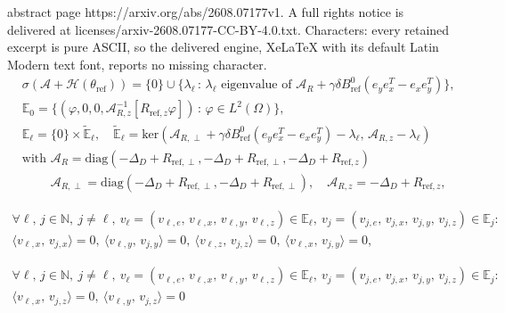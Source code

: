 \documentclass[10pt,a4paper]{amsart}
\newcommand\HH{\mathcal{H}}
\newcommand\calA{\mathcal{A}}
\begin{document}
abstract page https://arxiv.org/abs/2608.07177v1. A full rights notice is delivered at licenses/arxiv-2608.07177-CC-BY-4.0.txt. Characters: every retained excerpt is pure ASCII, so the delivered engine, XeLaTeX with its default Latin Modern text font, reports no missing character.
\begin{equation}\label{eigensystemBT}
\begin{aligned}
&\sigma(\calA+\HH(\theta_{\text{ref}}))=\{0\}\cup\{\lambda_\ell \, :\, \lambda_{\ell}\text{ eigenvalue of }\calA_R
+\gamma\delta B^0_{\text{ref}} (e_ye_x^T-e_xe_y^T)\}, \\ 
&\mathbb{E}_0 = \{(\varphi,0,0, \calA_{R,z}^{-1}[R_{\text{ref},z}\varphi])\, :\,\varphi\in L^2(\Omega)\},
\\ 
&\mathbb{E}_\ell = \{0\}\times\tilde{\mathbb{E}}_{\ell}, \quad
\tilde{\mathbb{E}}_{\ell}
=\text{ker}(\calA_{R,\perp}+\gamma\delta B^0_{\text{ref}} (e_ye_x^T-e_xe_y^T)-\lambda_\ell,\,\calA_{R,z}-\lambda_\ell)\\
&\text{with }\calA_R
=\text{diag}(-\Delta_D+R_{\text{ref},\perp},-\Delta_D+R_{\text{ref},\perp},-\Delta_D+R_{\text{ref},z})\\
&\phantom{\text{with }}
\calA_{R,\perp}=\text{diag}(-\Delta_D+R_{\text{ref},\perp},-\Delta_D+R_{\text{ref},\perp}),\quad
\calA_{R,z}=-\Delta_D+R_{\text{ref},z}, 
\end{aligned}
\end{equation}

\begin{equation}\label{orthogonality}
\begin{aligned}
\forall \ell,\, j\in\mathbb{N}, \ j\not=\ell, \ v_\ell=(v_{\ell,e},\,v_{\ell,x},\,v_{\ell,y},\,v_{\ell,z}) \in \mathbb{E}_\ell, \  
v_j=(v_{j,e},\,v_{j,x},\,v_{j,y},\,v_{j,z}) \in \mathbb{E}_j:\\
\langle v_{\ell,x},\,v_{j,x} \rangle=0, \  
\langle v_{\ell,y},\,v_{j,y} \rangle=0, \
\langle v_{\ell,z},\,v_{j,z} \rangle=0, \
\langle v_{\ell,x},\,v_{j,y} \rangle=0, \
\end{aligned}
\end{equation}

\begin{equation}\label{orthogonality_RperpRz}
\begin{aligned}
\forall \ell,\, j\in\mathbb{N}, \ j\not=\ell, \ v_\ell=(v_{\ell,e},\,v_{\ell,x},\,v_{\ell,y},\,v_{\ell,z}) \in \mathbb{E}_\ell, \  
v_j=(v_{j,e},\,v_{j,x},\,v_{j,y},\,v_{j,z}) \in \mathbb{E}_j:\\
\langle v_{\ell,x},\,v_{j,z} \rangle=0, \
\langle v_{\ell,y},\,v_{j,z} \rangle=0 
\end{aligned}
\end{equation}
\end{document}
